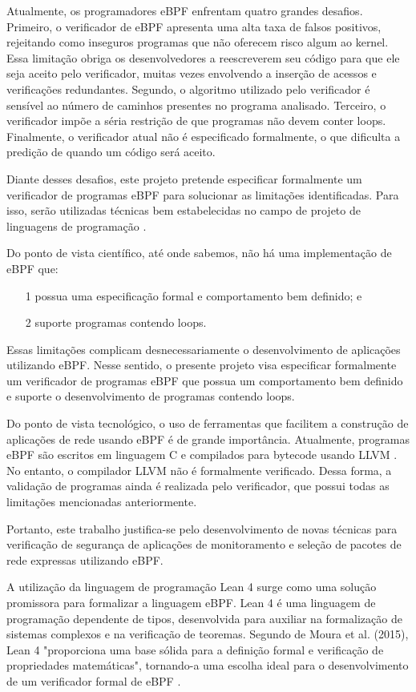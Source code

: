 \documentclass[sigconf]{acmart}
\begin{document}
Atualmente, os programadores eBPF enfrentam quatro grandes desafios. Primeiro, o verificador de eBPF apresenta uma alta taxa de falsos positivos, rejeitando como inseguros programas que não oferecem risco algum ao kernel. Essa limitação obriga os desenvolvedores a reescreverem seu código para que ele seja aceito pelo verificador, muitas vezes envolvendo a inserção de acessos e verificações redundantes. Segundo, o algoritmo utilizado pelo verificador é sensível ao número de caminhos presentes no programa analisado. Terceiro, o verificador impõe a séria restrição de que programas não devem conter loops. Finalmente, o verificador atual não é especificado formalmente, o que dificulta a predição de quando um código será aceito.

Diante desses desafios, este projeto pretende especificar formalmente um verificador de programas eBPF para solucionar as limitações identificadas. Para isso, serão utilizadas técnicas bem estabelecidas no campo de projeto de linguagens de programação \cite{pierce2002types} \cite{felleisen2009semantics}.

Do ponto de vista científico, até onde sabemos, não há uma implementação de eBPF que:
\begin{itemize}
\item[1] possua uma especificação formal e comportamento bem definido; e
\item[2] suporte programas contendo loops.
\end{itemize}

Essas limitações complicam desnecessariamente o desenvolvimento de aplicações utilizando eBPF. Nesse sentido, o presente projeto visa especificar formalmente um verificador de programas eBPF que possua um comportamento bem definido e suporte o desenvolvimento de programas contendo loops.

Do ponto de vista tecnológico, o uso de ferramentas que facilitem a construção de aplicações de rede usando eBPF é de grande importância. Atualmente, programas eBPF são escritos em linguagem C e compilados para bytecode usando LLVM \cite{ebpf}. No entanto, o compilador LLVM não é formalmente verificado. Dessa forma, a validação de programas ainda é realizada pelo verificador, que possui todas as limitações mencionadas anteriormente.

Portanto, este trabalho justifica-se pelo desenvolvimento de novas técnicas para verificação de segurança de aplicações de monitoramento e seleção de pacotes de rede expressas utilizando eBPF.

A utilização da linguagem de programação Lean 4 surge como uma solução promissora para formalizar a linguagem eBPF. Lean 4 é uma linguagem de programação dependente de tipos, desenvolvida para auxiliar na formalização de sistemas complexos e na verificação de teoremas. Segundo de Moura et al. (2015), Lean 4 "proporciona uma base sólida para a definição formal e verificação de propriedades matemáticas", tornando-a uma escolha ideal para o desenvolvimento de um verificador formal de eBPF \cite{de2015lean}.
\end{document}
